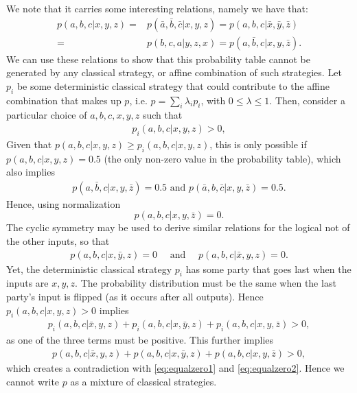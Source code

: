 \documentclass[aps,pra, twocolumn]{revtex4-1}
\begin{document}
We note that it carries some interesting relations, namely we have that:
\begin{align}
p(a,b,c|x,y,z)=&p(\bar{a},\bar{b},\bar{c}|x,y,z)=p(a,b,c|\bar{x},\bar{y},\bar{z})\\
=&p(b,c,a|y,z,x)=p(a,\bar{b},c|x,y,\bar{z}).
\end{align}
We can use these relations to show that this probability table cannot be generated by any classical strategy, or affine combination of such strategies. Let $p_i$ be some deterministic classical strategy that could contribute to the affine combination that makes up $p$, i.e. $p=\sum_i \lambda_i p_i$, with $0\leq \lambda \leq 1$. Then, consider a particular choice of $a,b,c,x,y,z$ such that 
\begin{align}
p_i(a,b,c|x,y,z)>0,  
\end{align}
Given that $ p(a,b,c|x,y,z) \geq p_i(a,b,c|x,y,z)$, this is only possible if  $p(a,b,c|x,y,z)=0.5$ (the only non-zero value in the probability table), which also implies 
\begin{align} 
p(a,\bar{b},c|x,y,\bar{z})=0.5 \text{ and } p(\bar{a},b,\bar{c}|x,y,\bar{z})=0.5.
\end{align}
Hence, using normalization
\begin{equation}
p(a,b,c|x,y,\bar{z})=0. \label{eq:equalzero1} 
\end{equation}
The cyclic symmetry may be used to derive similar relations for the logical not of the other inputs, so that
\begin{align}
p(a,b,c|x,\bar{y},z)=0 \quad \text{   and } \quad p(a,b,c|\bar{x},y,z)=0. \label{eq:equalzero2} 
\end{align}
Yet, the deterministic classical strategy $p_i$ has some party that goes last when the inputs are $x,y,z$. The probability distribution must be the same when the last party's input is flipped (as it occurs after all outputs). Hence $p_i(a,b,c|x,y,z)>0$ implies
\begin{align}
p_i(a,b,c|\bar{x},y,z)+p_i(a,b,c|x,\bar{y},z)+p_i(a,b,c|x,y,\bar{z})>0,
\end{align}
as one of the three terms must be positive. This further implies 
\begin{align}
p(a,b,c|\bar{x},y,z)+p(a,b,c|x,\bar{y},z)+p(a,b,c|x,y,\bar{z})>0,
\end{align}
which creates a contradiction  with \eqref{eq:equalzero1} and \eqref{eq:equalzero2}. Hence we cannot write $p$ as a mixture of classical strategies.  
\end{document}

